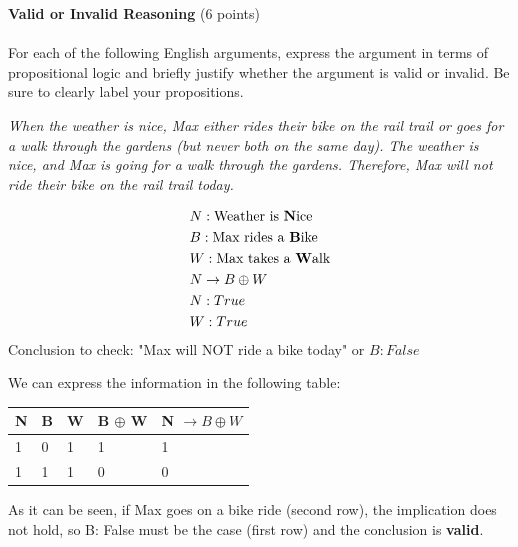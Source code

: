 \documentclass[12pt]{article}
\newenvironment{question}[2][Question]{\begin{trivlist}
\item[\hskip \labelsep {\bfseries #1}\hskip \labelsep {\bfseries #2.}]}{\end{trivlist}}
\newenvironment{solution}[1][Solution:]{\begin{trivlist}
\item[\hskip \labelsep {\bfseries #1}\hskip \labelsep {\bfseries}]\color{blue}}{\end{trivlist}}
\begin{document}
\begin{question}{1}\textbf{Valid or Invalid Reasoning} (6 points)\\\\
For each of the following English arguments, express the argument in terms of
propositional logic and briefly justify whether the argument is valid or invalid. Be sure to clearly label your propositions.
\begin{enumerate}[(a)]	
	\item \textit{When the weather is nice, Max either rides their bike on the rail trail or goes for a walk through the gardens (but never both on the same day). The weather is nice, and Max is going for a walk through the gardens. Therefore, Max will not ride their bike on the rail trail today.}

    \begin{solution}
        \begin{align*}
        &N : \text{Weather is \textbf{N}ice} \\
        &B : \text{Max rides a \textbf{B}ike} \\
        &W : \text{Max takes a \textbf{W}alk} \\
        &N \rightarrow B \oplus W \\
        &N : True \\
        &W : True \\
        \end{align*}
        Conclusion to check: "Max will NOT ride a bike today"
        or $B : False$

        We can express the information in the following table:
        
\begin{table}[h!]
\centering
\begin{tabular}{|l|l|l|l|l|}
\hline
N & B & W & B $\oplus$ W & N $\rightarrow B \oplus W$ \\ \hline
1 & 0 & 1 & 1                         & 1                                                      \\ \hline
1 & 1 & 1 & 0                         & 0                                                      \\ \hline
\end{tabular}
\end{table}        
        As it can be seen, if Max goes on a bike ride (second row), the implication does not hold, so B: False must be the case (first row) and the conclusion is \textbf{valid}.
    \end{solution}
    

\end{enumerate}
\end{question}
\end{document}
